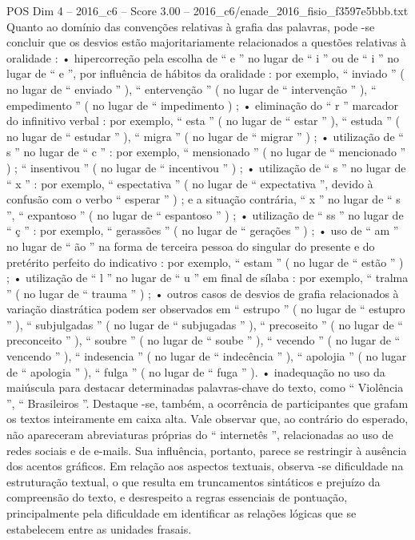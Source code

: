 \begin{textsample}{POS Dim 4 – 2016\_c6 – Score 3.00 – 2016\_c6/enade\_2016\_fisio\_f3597e5bbb.txt}
Quanto ao domínio das convenções relativas à grafia das palavras, pode -se concluir que os desvios estão majoritariamente relacionados a questões relativas à oralidade : • hipercorreção pela escolha de “ e ” no lugar de “ i ” ou de “ i ” no lugar de “ e ”, por influência de hábitos da oralidade : por exemplo, “ inviado ” ( no lugar de “ enviado ” ), “ entervenção ” ( no lugar de “ intervenção ” ), “ empedimento ” ( no lugar de “ impedimento ) ; • eliminação do “ r ” marcador do infinitivo verbal : por exemplo, “ esta ” ( no lugar de “ estar ” ), “ estuda ” ( no lugar de “ estudar ” ), “ migra ” ( no lugar de “ migrar ” ) ; • utilização de “ s ” no lugar de “ c ” : por exemplo, “ mensionado ” ( no lugar de “ mencionado ” ) ; “ insentivou ” ( no lugar de “ incentivou ” ) ; • utilização de “ s ” no lugar de “ x ” : por exemplo, “ espectativa ” ( no lugar de “ expectativa ”, devido à confusão com o verbo “ esperar ” ) ; e a situação contrária, “ x ” no lugar de “ s ”, “ expantoso ” ( no lugar de “ espantoso ” ) ; • utilização de “ ss ” no lugar de “ ç ” : por exemplo, “ gerassões ” ( no lugar de “ gerações ” ) ; • uso de “ am ” no lugar de “ ão ” na forma de terceira pessoa do singular do presente e do pretérito perfeito do indicativo : por exemplo, “ estam ” ( no lugar de “ estão ” ) ; • utilização de “ l ” no lugar de “ u ” em final de sílaba : por exemplo, “ tralma ” ( no lugar de “ trauma ” ) ; • outros casos de desvios de grafia relacionados à variação diastrática podem ser observados em “ estrupo ” ( no lugar de “ estupro ” ), “ subjulgadas ” ( no lugar de “ subjugadas ” ), “ precoseito ” ( no lugar de “ preconceito ” ), “ soubre ” ( no lugar de “ soube ” ), “ vecendo ” ( no lugar de “ vencendo ” ), “ indesencia ” ( no lugar de “ indecência ” ), “ apolojia ” ( no lugar de “ apologia ” ), “ fulga ” ( no lugar de “ fuga ” ). • inadequação no uso da maiúscula para destacar determinadas palavras-chave do texto, como “ Violência ”, “ Brasileiros ”.
Destaque -se, também, a ocorrência de participantes que grafam os textos inteiramente em caixa alta.
Vale observar que, ao contrário do esperado, não apareceram abreviaturas próprias do “ internetês ”, relacionadas ao uso de redes sociais e de e-mails.
Sua influência, portanto, parece se restringir à ausência dos acentos gráficos.
Em relação aos aspectos textuais, observa -se dificuldade na estruturação textual, o que resulta em truncamentos sintáticos e prejuízo da compreensão do texto, e desrespeito a regras essenciais de pontuação, principalmente pela dificuldade em identificar as relações lógicas que se estabelecem entre as unidades frasais.

\end{textsample}
